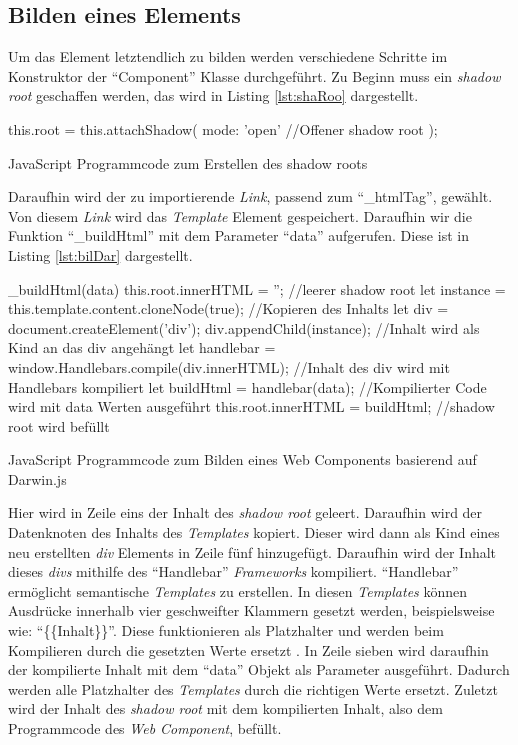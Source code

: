 \documentclass[12pt, paper=a4, bibtotoc, toc=listof, headsepline=true, numbers=endperiod]{scrreprt}
\begin{document}
	\subsection{Bilden eines Elements}
	Um das Element letztendlich zu bilden werden verschiedene Schritte im Konstruktor der \enquote{Component} Klasse durchgeführt. Zu Beginn muss ein \emph{shadow root} geschaffen werden, das wird in Listing \ref{lst:shaRoo} dargestellt.
	\begin{listing}
		\begin{JavaScriptcode*}{}
this.root = this.attachShadow({
   mode: 'open' //Offener shadow root
});
		\end{JavaScriptcode*}
		\caption[Erstellung des shadow roots]{JavaScript Programmcode zum Erstellen des shadow roots}
		\label{lst:shaRoo}  
	\end{listing}\noindent
	Daraufhin wird der zu importierende \emph{Link}, passend zum \enquote{\_htmlTag}, gewählt. Von diesem \emph{Link} wird das \emph{Template} Element gespeichert. Daraufhin wir die Funktion \enquote{\_buildHtml} mit dem Parameter \enquote{data} aufgerufen. Diese ist in Listing \ref{lst:bilDar} dargestellt.
		\begin{listing}
		\begin{JavaScriptcode*}{}
_buildHtml(data) {
   this.root.innerHTML = ''; //leerer shadow root
   let instance = this.template.content.cloneNode(true); //Kopieren des Inhalts
   let div = document.createElement('div'); 
   div.appendChild(instance); //Inhalt wird als Kind an das div angehängt
   let handlebar = window.Handlebars.compile(div.innerHTML); //Inhalt des div wird mit Handlebars kompiliert
   let buildHtml = handlebar(data); //Kompilierter Code wird mit data Werten ausgeführt
   this.root.innerHTML = buildHtml; //shadow root wird befüllt
}
		\end{JavaScriptcode*}
		\caption[Bilden des Web Components]{JavaScript Programmcode zum Bilden eines Web Components basierend auf Darwin.js}
		\label{lst:bilDar}
		\end{listing}\noindent
	Hier wird in Zeile eins der Inhalt des \emph{shadow root} geleert. Daraufhin wird der Datenknoten des Inhalts des \emph{Templates} kopiert. Dieser wird dann als Kind eines neu erstellten \emph{div} Elements in Zeile fünf hinzugefügt. Daraufhin wird der Inhalt dieses \emph{divs} mithilfe des \enquote{Handlebar} \emph{Frameworks} kompiliert. \enquote{Handlebar} ermöglicht semantische \emph{Templates} zu erstellen. In diesen \emph{Templates} können Ausdrücke innerhalb vier geschweifter Klammern gesetzt werden, beispielsweise wie: \enquote{\{\{Inhalt\}\}}. Diese funktionieren als Platzhalter und werden beim Kompilieren durch die gesetzten Werte ersetzt \cite{handlebars}. In Zeile sieben wird daraufhin der kompilierte Inhalt mit dem \enquote{data} Objekt als Parameter ausgeführt. Dadurch werden alle Platzhalter des \emph{Templates} durch die richtigen Werte ersetzt. Zuletzt wird der Inhalt des \emph{shadow root} mit dem kompilierten Inhalt, also dem Programmcode des \emph{Web Component}, befüllt.
\end{document}
